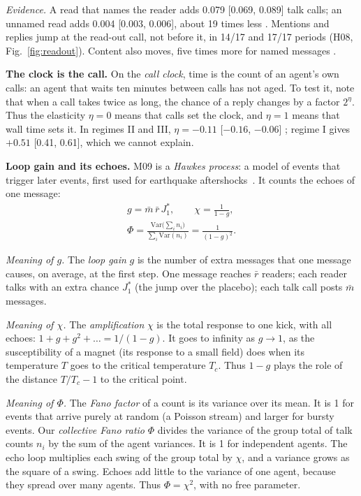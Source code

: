 \emph{Evidence.} A read that names the reader adds 0.079 [0.069, 0.089] talk calls; an unnamed read adds 0.004 [0.003, 0.006], about 19 times less . Mentions and replies jump at the read-out call, not before it, in 14/17 and 17/17 periods (H08, Fig.~\ref{fig:readout}). Content also moves, five times more for named messages .

\textbf{The clock is the call.} On the \emph{call clock}, time is the count of an agent's own calls: an agent that waits ten minutes between calls has not aged. To test it, note that when a call takes twice as long, the chance of a reply changes by a factor $2^{\eta}$. Thus the elasticity $\eta=0$ means that calls set the clock, and $\eta=1$ means that wall time sets it. In regimes II and III, $\eta=-0.11$ [$-0.16$, $-0.06$] ; regime I gives $+0.51$ [0.41, 0.61], which we cannot explain.

\textbf{Loop gain and its echoes.} M09 is a \emph{Hawkes process}: a model of events that trigger later events, first used for earthquake aftershocks~\cite{hawkes1971}. It counts the echoes of one message:
\begin{equation}
\begin{gathered}
g=\bar m\,\bar r\,J_1^\ast,\qquad \chi=\frac{1}{1-g},\\
\Phi=\frac{\mathrm{Var}\big(\sum_i n_i\big)}{\sum_i\mathrm{Var}(n_i)}=\frac{1}{(1-g)^2}.
\end{gathered}
\label{eq:fano}
\end{equation}

\emph{Meaning of $g$.} The \emph{loop gain} $g$ is the number of extra messages that one message causes, on average, at the first step. One message reaches $\bar r$ readers; each reader talks with an extra chance $J_1^\ast$ (the jump over the placebo); each talk call posts $\bar m$ messages.

\emph{Meaning of $\chi$.} The \emph{amplification} $\chi$ is the total response to one kick, with all echoes: $1+g+g^2+\dots=1/(1-g)$. It goes to infinity as $g\to1$, as the susceptibility of a magnet (its response to a small field) does when its temperature $T$ goes to the critical temperature $T_c$. Thus $1-g$ plays the role of the distance $T/T_c-1$ to the critical point.

\emph{Meaning of $\Phi$.} The \emph{Fano factor} of a count is its variance over its mean. It is 1 for events that arrive purely at random (a Poisson stream) and larger for bursty events. Our \emph{collective Fano ratio} $\Phi$ divides the variance of the group total of talk counts $n_i$ by the sum of the agent variances. It is 1 for independent agents. The echo loop multiplies each swing of the group total by $\chi$, and a variance grows as the square of a swing. Echoes add little to the variance of one agent, because they spread over many agents. Thus $\Phi=\chi^2$, with no free parameter.

